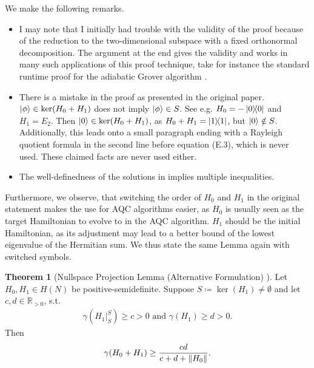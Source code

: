 \documentclass[10pt]{amsart}
\theoremstyle{definition}
\newtheorem{theorem}{Theorem}
\theoremstyle{remark}
\begin{document}
    We make the following remarks.
    \begin{itemize}[wide]
        \item I may note that I initially had trouble with the validity of the proof because of the reduction to the two-dimensional subspace with a fixed orthonormal decomposition. The argument at the end gives the validity and works in many such applications of this proof technique, take for instance the standard runtime proof for the adiabatic Grover algorithm \cite[pp. 8-10]{Albash_2018}.
        \item There is a mistake in the proof as presented in the original paper. \(\ket{\phi} \in \ker(H_0+H_1)\) does not imply \(\ket{\phi} \in S\). See e.g. \(H_0 = -\ketbra{0}{0}\) and \(H_1 = E_2\). Then \(\ket{0} \in \ker(H_0+H_1)\), as \(H_0+H_1 = \ketbra{1}{1}\), but \(\ket{0} \notin S\). Additionally, this leads onto a small paragraph ending with a Rayleigh quotient formula in the second line before equation (E.3), which is never used. These claimed facts are never used either.
        \item The well-definedness of the solutions in  implies multiple inequalities.
    \end{itemize}

    Furthermore, we observe, that switching the order of \(H_0\) and \(H_1\) in the original statement makes the use for AQC algorithms easier, as \(H_0\) is usually seen as the target Hamiltonian to evolve to in the AQC algorithm. \(H_1\) should be the initial Hamiltonian, as its adjustment may lead to a better bound of the lowest eigenvalue of the Hermitian sum. We thus state the same Lemma again with switched symbols.

    \begin{theorem}[{Nullspace Projection Lemma (Alternative Formulation) \cite[p. 73]{Childs_2014}}]
        Let \(H_0, H_1 \in H(N)\) be positive-semidefinite. Suppose \(S \coloneqq \ker(H_1) \neq \emptyset\) and let \(c, d \in \mathbb{R}_{> 0}\), s.t.
        \begin{align}
            \gamma(H_1|_S^S) \geq c > 0 \text{ and } \gamma(H_1) \geq d > 0.
        \end{align}
        Then
        \begin{align}
            \gamma(H_0+H_1) \geq \frac{cd}{c+d+\norm{H_0}}.
        \end{align}
    \end{theorem}
\end{document}
